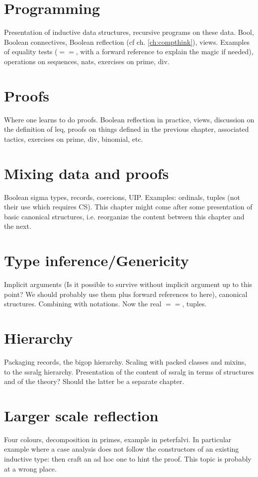 \documentclass{book}
\begin{document}
\chapter{Programming}

Presentation of inductive data structures, recursive programs on these
data.
Bool, Boolean connectives, Boolean reflection (cf
ch. \ref{ch:compthink}), views.
Examples of equality tests ($==$, with a forward reference to
explain the magic if needed), operations on sequences, nats,
exercises on prime, div.

\chapter{Proofs}

Where one learns to do proofs.
Boolean reflection in practice, views, discussion on the definition of leq,
proofs on things defined in the
previous chapter, associated tactics, exercises on prime, div,
binomial, etc.

\chapter{Mixing data and proofs}
Boolean sigma types, records, coercions, UIP. Examples: ordinals,
tuples (not their use which requires CS). This chapter might come
after some presentation of basic canonical structures, i.e. reorganize
the content between this chapter and the next.

\chapter{Type inference/Genericity}

Implicit arguments (Is it possible to survive without implicit
argument up to this point? We should probably use them plus forward
references to here), canonical structures. Combining with
notations. Now the real $==$, tuples. 

\chapter{Hierarchy}
Packaging records, the bigop hierarchy.
Scaling with packed classes and mixins, to the ssralg
hierarchy. Presentation of the content of ssralg in terms of structures
and of the theory? Should the latter be a separate chapter.

\chapter{Larger scale reflection}
Four colours, decomposition in primes, example in peterfalvi. In
particular example where a case analysis does not follow the
constructors of an existing inductive type: then craft an ad hoc one
to hint the proof. This topic is probably at a wrong place.
\end{document}
